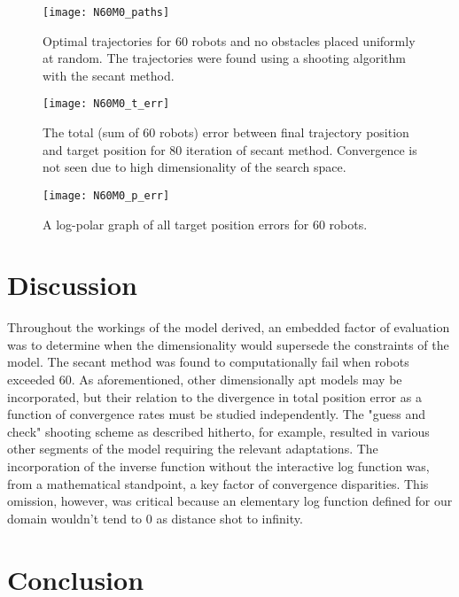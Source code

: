 \documentclass[11pt]{article}
\begin{document}
\begin{figure}
	\centering
	\texttt{[image: N60M0\_paths]}
	\caption{Optimal trajectories for 60 robots and no obstacles placed uniformly at random. The trajectories were found using a shooting algorithm with the secant method.}
	\label{fig:n60m0-paths}
\end{figure}

\begin{figure}
	\centering
	\texttt{[image: N60M0\_t\_err]}
	\caption{The total (sum of 60 robots) error between final trajectory position and target position for 80 iteration of secant method. Convergence is not seen due to high dimensionality of the search space.}
	\label{fig:n60m0-t-err}
\end{figure}

\begin{figure}
	\centering
	\texttt{[image: N60M0\_p\_err]}
	\caption{A log-polar graph of all target position errors for 60 robots.}
	\label{fig:n60m0-p-err}
\end{figure}

\section{Discussion}

Throughout the workings of the model derived, an embedded factor of evaluation was to determine when the dimensionality would supersede the constraints of the model. The secant method was found to computationally fail when robots exceeded 60. As aforementioned, other dimensionally apt models may be incorporated, but their relation to the divergence in total position error as a function of convergence rates must be studied independently. The "guess and check" shooting scheme as described hitherto, for example, resulted in various other segments of the model requiring the relevant adaptations. The incorporation of the inverse function without the interactive log function was, from a mathematical standpoint, a key factor of convergence disparities. This omission, however, was critical because an elementary log function defined for our domain wouldn't tend to 0 as distance shot to infinity. 


\section{Conclusion}
\end{document}
